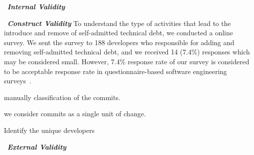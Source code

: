 \noindent~\textbf{\textit{Internal Validity}}


\noindent~\textbf{\textit{Construct Validity}}
To understand the type of activities that lead to the introduce and remove of self-admitted technical debt, we conducted a online survey. We sent the survey to 188 developers who responsible for adding and removing self-admitted technical debt, and we received 14 (7.4\%) responses which may be considered small. However, 7.4\% response rate of our survey is considered to be acceptable response rate in questionnaire-based
software engineering surveys~\cite{singer2008software}.






manually classification of the commits. 

we consider commits as a single unit of change.

Identify the unique developers 


\noindent~\textbf{\textit{External Validity}}